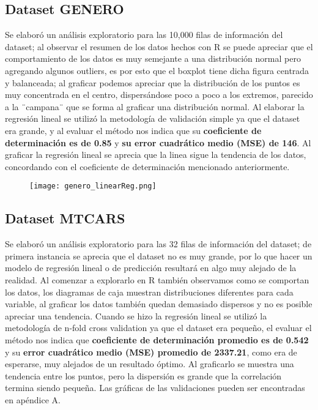 \documentclass[sigconf,authorversion,nonacm]{acmart}
\begin{document}
\subsection{Dataset GENERO}
Se elaboró un análisis exploratorio para las 10,000 filas de información del dataset; al observar el resumen de los datos hechos con R se puede apreciar que el comportamiento de los datos es muy semejante a una distribución normal pero agregando algunos outliers, es por esto que el boxplot tiene dicha figura centrada y balanceada; al graficar podemos apreciar que la distribución de los puntos es muy concentrada en el centro, dispersándose poco a poco a los extremos, parecido a la ¨campana¨ que se forma al graficar una distribución normal.
Al elaborar la regresión lineal se utilizó la metodología de validación simple ya que el dataset era grande, y al evaluar el método nos indica que su \textbf{coeficiente de determinación es de 0.85} y \textbf{su error cuadrático medio (MSE) de 146}. Al graficar la regresión lineal se aprecia que la linea sigue la tendencia de los datos, concordando con el coeficiente de determinación mencionado anteriormente.

\begin{figure}[H]
  \centering
  \texttt{[image: genero\_linearReg.png]}
\end{figure}


\subsection{Dataset MTCARS}
Se elaboró un análisis exploratorio para las 32 filas de información del dataset; de primera instancia se aprecia que el dataset no es muy grande, por lo que hacer un modelo de regresión lineal o de predicción resultará en algo muy alejado de la realidad. Al comenzar a explorarlo en R también observamos como se comportan los datos, los diagramas de caja muestran distribuciones diferentes para cada variable, al graficar los datos también quedan demasiado dispersos y no es posible apreciar una tendencia.
Cuando se hizo la regresión lineal se utilizó la metodología de n-fold cross validation ya que el dataset era pequeño, el evaluar el método nos indica que \textbf{coeficiente de determinación promedio es de 0.542} y su \textbf{error cuadrático medio (MSE) promedio de 2337.21}, como era de esperarse, muy alejados de un resultado óptimo.
Al graficarlo se muestra una tendencia entre los puntos, pero la dispersión es grande que la correlación termina siendo pequeña. Las gráficas de las validaciones pueden ser encontradas en apéndice A.
\end{document}
